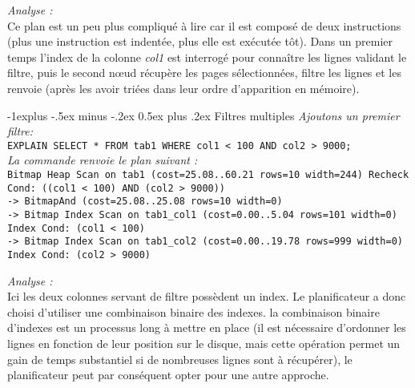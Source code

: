 \documentclass[10pt,landscape, a4paper]{article}
\makeatletter
\renewcommand{\subsection}{\@startsection{subsection}{2}{0mm}%
                                {-1explus -.5ex minus -.2ex}%
                                {0.5ex plus .2ex}%
                                {\normalfont\normalsize\bfseries}}
\makeatother
\begin{document}
\begin{multicols}{3}
\hspace{0.25em} {\scriptsize \emph{Analyse :}}\\
{\scriptsize Ce plan est un peu plus compliqué à lire car il est composé de deux instructions (plus une instruction est indentée, plus elle est exécutée tôt). Dans un premier temps  \textcolor{table}{l'index de la colonne \emph{col1}} \textcolor{node}{est interrogé} pour connaître les lignes validant  \textcolor{filter}{le filtre,} puis  \textcolor{node2}{le second nœud} récupère les pages sélectionnées,  \textcolor{filter2}{filtre les lignes} et les renvoie (après les avoir triées dans leur ordre d'apparition en mémoire).}

\subsection{Filtres multiples}
%
\hspace{0.25em} {\scriptsize \emph{Ajoutons un premier filtre:}}\\
\texttt{EXPLAIN SELECT * FROM tab1 WHERE col1 < 100 AND col2 > 9000;}\\
\hspace{0.25em} {\scriptsize \emph{La commande renvoie le plan suivant :}}\\
\texttt{Bitmap Heap Scan on tab1  (cost=25.08..60.21 rows=10 width=244)
    Recheck Cond: ((col1 < 100) AND (col2 > 9000))\\
     \hspace{0.25em} ->  \textcolor{node}{BitmapAnd}  (cost=\textcolor{mcost}{25.08}..25.08 rows=10 width=0)\\ 
     	\hspace{0.75em} ->  Bitmap Index Scan on \textcolor{table}{tab1\_col1}  (cost=0.00..5.04 rows=101 width=0) Index Cond: (col1 < 100)\\
         	\hspace{0.75em} ->  Bitmap Index Scan on \textcolor{table}{tab1\_col2}  (cost=0.00..19.78 rows=999 width=0)  Index Cond: (col2 > 9000)}

\hspace{0.25em} {\scriptsize \emph{Analyse :}}\\
{\scriptsize Ici les deux colonnes servant de filtre possèdent \textcolor{table}{un index.} Le planificateur a donc choisi d'utiliser \textcolor{node}{une combinaison binaire des indexes.} la combinaison binaire d'indexes est \textcolor{mcost}{un processus long à mettre en place} (il est nécessaire d'ordonner les lignes en fonction de leur position sur le disque, mais cette opération permet un gain de temps substantiel si de nombreuses lignes sont à récupérer), le planificateur peut par conséquent opter pour une autre approche.}


\end{multicols}
\end{document}
